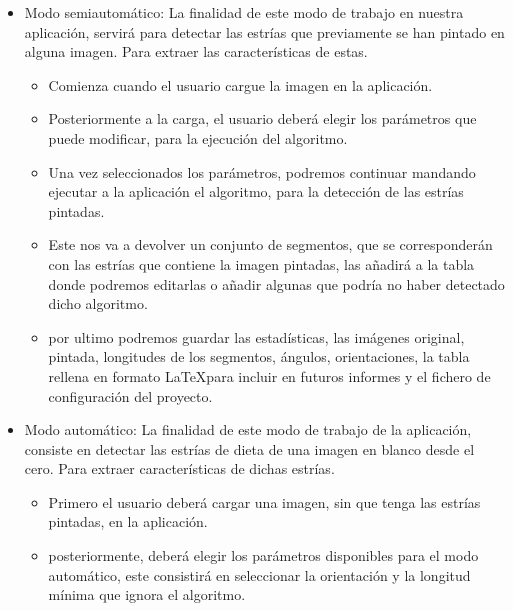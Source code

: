\begin{itemize}
	\item Modo semiautomático:
La finalidad de este modo de trabajo en nuestra aplicación, servirá para detectar las estrías que previamente se han pintado en alguna imagen. Para extraer las características de estas.
	\begin{itemize}
		\item Comienza cuando el usuario cargue la imagen en la aplicación.
		\item Posteriormente a la carga, el usuario deberá elegir los parámetros que puede modificar, para la ejecución del algoritmo.
		\item Una vez seleccionados los parámetros, podremos continuar mandando ejecutar a la aplicación el algoritmo, para la detección de las estrías pintadas.
		\item Este nos va a devolver un conjunto de segmentos, que se corresponderán con las estrías que contiene la imagen pintadas, las añadirá a la tabla donde podremos editarlas o añadir algunas que podría no haber detectado dicho algoritmo.
		\item por ultimo podremos guardar las estadísticas, las imágenes original, pintada, longitudes de los segmentos, ángulos, orientaciones, la tabla rellena en formato \LaTeX para incluir en futuros informes y el fichero de configuración del proyecto.
	\end{itemize}
	\item Modo automático:
	La finalidad de este modo de trabajo de la aplicación, consiste en detectar las estrías de dieta de una imagen en blanco desde el cero. Para extraer características de dichas estrías.
	\begin{itemize}
		\item Primero el usuario deberá cargar una imagen, sin que tenga las estrías pintadas, en la aplicación.
		\item posteriormente, deberá elegir los parámetros disponibles para el modo automático, este consistirá en seleccionar la orientación y la longitud mínima que ignora el algoritmo.
		

\end{itemize}
\end{itemize}
